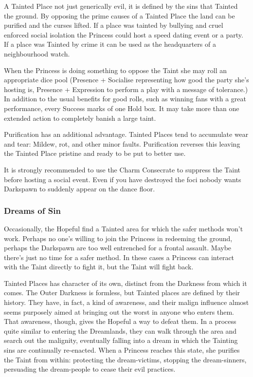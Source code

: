 A Tainted Place not just generically evil, it is defined by the sins that Tainted the ground. By opposing the prime causes of a Tainted Place the land can be purified and the curses lifted. If a place was tainted by bullying and cruel enforced social isolation the Princess could host a speed dating event or a party. If a place was Tainted by crime it can be used as the headquarters of a neighbourhood watch. 

When the Princess is doing something to oppose the Taint she may roll an appropriate dice pool (Presence + Socialise representing how good the party she's hosting is, Presence + Expression to perform a play with a message of tolerance.) In addition to the usual benefits for good rolls, such as winning fans with a great performance, every Success marks of one Hold box. It may take more than one extended action to completely banish a large taint. 

Purification has an additional advantage. Tainted Places tend to accumulate wear and tear: Mildew, rot, and other minor faults. Purification reverses this leaving the Tainted Place pristine and ready to be put to better use.

It is strongly recommended to use the Charm Consecrate to suppress the Taint before hosting a social event. Even if you have destroyed the foci nobody wants Darkspawn to suddenly appear on the dance floor.

\subsubsection*{Dreams of Sin}

Occasionally, the Hopeful find a Tainted area for which the safer methods won't work. Perhaps no one's willing to join the Princess in redeeming the ground, perhaps the Darkspawn are too well entrenched for a frontal assault. Maybe there's just no time for a safer method. In these cases a Princess can interact with the Taint directly to fight it, but the Taint will fight back. 

Tainted Places has character of its own, distinct from the Darkness from which it comes. The Outer Darkness is formless, but Tainted places are defined by their history. They have, in fact, a kind of awareness, and their malign influence almost seems purposely aimed at bringing out the worst in anyone who enters them. That awareness, though, gives the Hopeful a way to defeat them. In a process quite similar to entering the Dreamlands, they can walk through the area and search out the malignity, eventually falling into a dream in which the Tainting sins are continually re-enacted. When a Princess reaches this state, she purifies the Taint from within: protecting the dream-victims, stopping the dream-sinners, persuading the dream-people to cease their evil practices.

